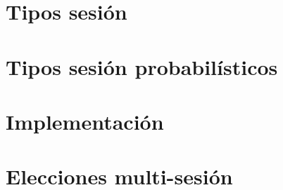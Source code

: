 \documentclass[11pt,a4paper]{tesis}
\begin{document}

\def\autor{Iván Pondal}
\def\tituloTesis{Inferencia de tipos sesión probabilísticos}
\def\runtitulo{Inferencia de tipos sesión probabilísticos}
\def\director{Hernán Melgratti}
\def\lugar{Buenos Aires, 2021}


\frontmatter
\pagestyle{empty}


\cleardoublepage

\cleardoublepage

\cleardoublepage
\tableofcontents

\listoftodos

\mainmatter
\pagestyle{headings}


\chapter{Tipos sesión}





\chapter{Tipos sesión probabilísticos}





\chapter{Implementación}



\chapter{Elecciones multi-sesión}



\backmatter


\end{document}
